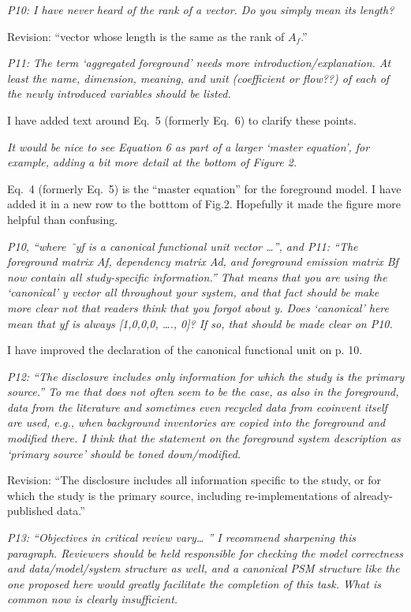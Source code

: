 \documentclass[11pt,letterpaper]{article}
\begin{document}
\emph{P10: I have never heard of the rank of a vector. Do you simply mean its length?}

Revision: ``vector whose length is the same as the rank of $A_ f$.''

\emph{P11: The term ‘aggregated foreground’ needs more introduction/explanation. At least the name, dimension, meaning, and unit (coefficient or flow??) of each of the newly introduced variables should be listed.}

I have added text around Eq.~5 (formerly Eq.~6) to clarify these points.

\emph{It would be nice to see Equation 6 as part of a larger ‘master equation’, for example, adding a bit more detail at the bottom of Figure 2.}

Eq.~4 (formerly Eq.~5) is the ``master equation'' for the foreground model.  I have added it in a new row to the botttom of Fig.2.  Hopefully it made the figure more helpful than confusing.

\emph{P10, “where ˜yf is a canonical functional unit vector …”, and P11: “The foreground matrix Af, dependency matrix Ad, and foreground emission matrix Bf now contain all study-specific information.”
  That means that you are using the ‘canonical’ y vector all throughout your system, and that fact should be make more clear not that readers think that you forgot about y. Does ‘canonical’ here mean that yf is always [1,0,0,0, …., 0]? If so, that should be made clear on P10.}

I have improved the declaration of the canonical functional unit on p. 10.

\emph{P12: “The disclosure includes only information for which the study is the primary source.” To me that does not often seem to be the case, as also in the foreground, data from the literature and sometimes even recycled data from ecoinvent itself are used, e.g., when background inventories are copied into the foreground and modified there.
  I think that the statement on the foreground system description as ‘primary source’ should be toned down/modified.}

Revision: ``The disclosure includes all information specific to the study, or for which the study is the primary source, including re-implementations of already-published data.''

\emph{P13: “Objectives in critical review vary… ” I recommend sharpening this paragraph. Reviewers should be held responsible for checking the model correctness and data/model/system structure as well, and a canonical PSM structure like the one proposed here would greatly facilitate the completion of this task. What is common now is clearly insufficient.}
\end{document}

